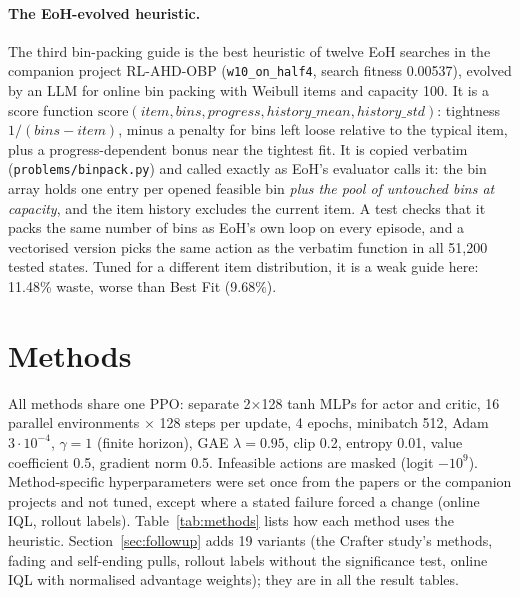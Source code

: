 \documentclass[11pt,a4paper]{article}
\begin{document}
\paragraph{The EoH-evolved heuristic.} The third bin-packing guide is the best heuristic of twelve EoH searches in the
companion project RL-AHD-OBP (\texttt{w10\_on\_half4}, search fitness 0.00537), evolved by an LLM for online bin
packing with Weibull items and capacity 100. It is a score function $\mathrm{score}(\mathit{item}, \mathit{bins},
\mathit{progress}, \mathit{history\_mean}, \mathit{history\_std})$: tightness $1/(\mathit{bins} - \mathit{item})$,
minus a penalty for bins left loose relative to the typical item, plus a progress-dependent bonus near the tightest
fit. It is copied verbatim (\texttt{problems/binpack.py}) and called exactly as EoH's evaluator calls it: the bin
array holds one entry per opened feasible bin \emph{plus the pool of untouched bins at capacity}, and the item history
excludes the current item. A test checks that it packs the same number of bins as EoH's own loop on every episode,
and a vectorised version picks the same action as the verbatim function in all 51,200 tested states. Tuned for a
different item distribution, it is a weak guide here: 11.48\% waste, worse than Best Fit (9.68\%).

\section{Methods}

All methods share one PPO: separate 2$\times$128 tanh MLPs for actor and critic, 16 parallel environments
$\times$ 128 steps per update, 4 epochs, minibatch 512, Adam $3\cdot10^{-4}$, $\gamma = 1$ (finite horizon), GAE
$\lambda = 0.95$, clip 0.2, entropy 0.01, value coefficient 0.5, gradient norm 0.5. Infeasible actions are masked
(logit $-10^9$). Method-specific hyperparameters were set once from the papers or the companion projects and not
tuned, except where a stated failure forced a change (online IQL, rollout labels). Table~\ref{tab:methods} lists how
each method uses the heuristic. Section~\ref{sec:followup} adds 19 variants (the Crafter study's methods,
fading and self-ending pulls, rollout labels without the significance test, online IQL with normalised advantage
weights); they are in all the result tables.
\end{document}
